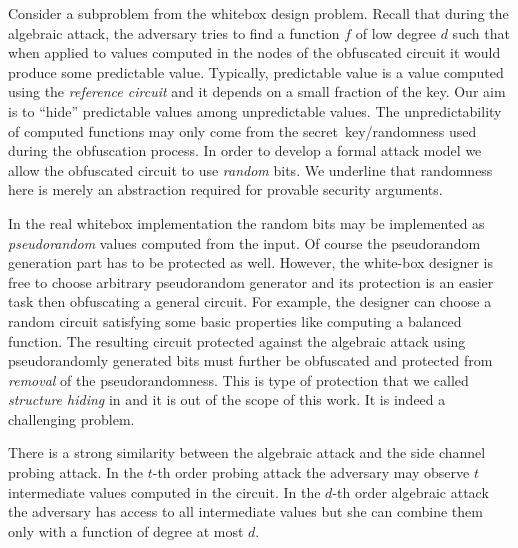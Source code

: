 
Consider a subproblem from the whitebox design problem. Recall that during the algebraic attack, the adversary tries to find a function $f$ of low degree $d$ such that when applied to values computed in the nodes of the obfuscated circuit it would produce some predictable value. Typically, predictable value is a value computed using the \emph{reference circuit} and it depends on a small fraction of the key. Our aim is to ``hide'' predictable values among unpredictable values. The unpredictability of computed functions may only come from the secret~key/randomness used during the obfuscation process. In order to develop a formal attack model we allow the obfuscated circuit to use \emph{random} bits. We underline that randomness here is merely an abstraction required for provable security arguments. 

In the real whitebox implementation the random bits may be implemented as \emph{pseudorandom} values computed from the input. Of course the pseudorandom generation part has to be protected as well. However, the white-box designer is free to choose arbitrary pseudorandom generator and its protection is an easier task then obfuscating a general circuit. For example, the designer can choose a random circuit satisfying some basic properties like computing a balanced function. The resulting circuit protected against the algebraic attack using pseudorandomly generated bits must further be obfuscated and protected from \emph{removal} of the pseudorandomness. This is type of protection that we called \emph{structure hiding} in  and it is out of the scope of this work. It is indeed a challenging problem.

There is a strong similarity between the algebraic attack and the side channel probing attack. In the $t$-th order probing attack the adversary may observe $t$ intermediate values computed in the circuit. In the $d$-th order algebraic attack the adversary has access to all intermediate values but she can combine them only with a function of degree at most $d$.

